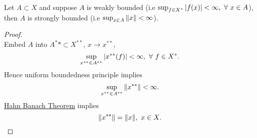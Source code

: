 \vspace{3pt}
\begin{corollary}\ \\
    Let $A \subset X$ and suppose $A$ is weakly bounded (i.e $\sup_{f \in X^*} \abs{f(x)} < \infty,\ \forall\ x \in A$), then $A$ is strongly bounded (i.e $\sup_{x \in A} \norm{x} < \infty$).
\end{corollary}
\begin{proof}\ \\
Embed $A$ into $A^** \subset X^{**}$, $x \to x^{**}$, 
\begin{equation*}
    \sup_{x^{**} \in A^{**}} \abs{x^{**} (f)} < \infty,\ \forall\ f \in X^*.
\end{equation*}
Hence uniform boundedness principle implies
\begin{equation*}
    \sup_{x^{**} \in A^{**}} \norm{x^{**}} < \infty.
\end{equation*}
\hyperref[HB thm]{Hahn Banach Theorem} implies
\begin{equation*}
    \norm{x^{**}} = \norm{x},\ x \in X.
\end{equation*}
\end{proof}













